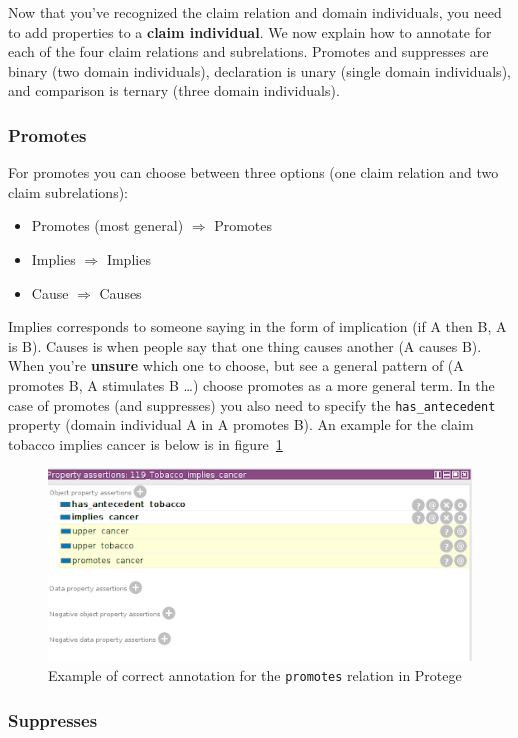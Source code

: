 Now that you’ve recognized the claim relation and domain individuals, you need
to add properties to a \textbf{claim individual}. We now explain how to annotate for
each of the four claim relations and subrelations. Promotes and suppresses are
binary (two domain individuals), declaration is unary (single domain
individuals), and comparison is ternary (three domain individuals). 

\subsubsection{Promotes}

For promotes you can choose between three options (one claim relation and two
claim subrelations):
\begin{itemize}
\item Promotes (most general) $\Rightarrow$ Promotes 
\item Implies $\Rightarrow$ Implies
\item Cause $\Rightarrow$ Causes
\end{itemize}
Implies corresponds to someone saying in the form of implication (if A then B,
A is B). Causes is when people say that one thing causes another (A causes B).
When you’re \textbf{unsure} which one to choose, but see a general pattern of (A
promotes B, A stimulates B \dots) choose promotes as a more general term.
In the case of promotes (and suppresses) you also need to specify the
\texttt{has\_antecedent} property (domain individual A in A promotes B). An example for
the claim tobacco implies cancer is below is in figure~\ref{fig:promotes_example}

\begin{figure}
	\includegraphics{promotes.png}
	\caption{Example of correct annotation for the \texttt{promotes} relation in Protege}
\label{fig:promotes_example}
\end{figure}

\subsubsection{Suppresses}


